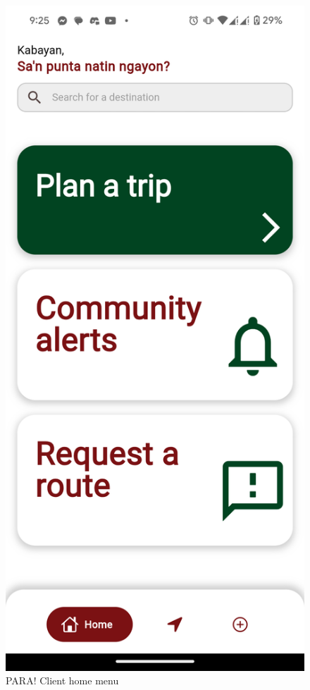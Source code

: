 \documentclass{icsthesis}
\begin{document}
\begin{mainmatter}
\begin{description}
		\begin{figure}[!h]
			\centering
				\includegraphics[scale=0.1]{./figures/client/home menu.png}
			\caption{PARA! Client home menu}
		\end{figure}
		

\end{description}
\end{mainmatter}
\end{document}
